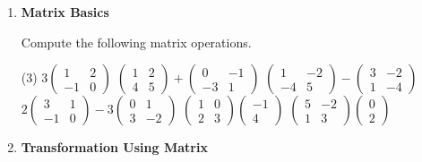 \begin{enumerate}
\item \textbf{Matrix Basics} 

Compute the following matrix operations.
\begin{tasks}[after-skip = 80pt, after-item-skip = 80pt](3)
\task $3 \begin{pmatrix} 1 & 2 \\ -1 & 0 \end{pmatrix}$
\task $\begin{pmatrix} 1 & 2 \\ 4 & 5 \end{pmatrix} + \begin{pmatrix} 0 & -1 \\ -3 & 1 \end{pmatrix}$
\task $\begin{pmatrix} 1 & -2 \\ -4 & 5 \end{pmatrix} - \begin{pmatrix} 3 & -2 \\ 1 & -4 \end{pmatrix}$
\task $2 \begin{pmatrix} 3 & 1 \\ -1 & 0 \end{pmatrix} - 3 \begin{pmatrix} 0 & 1 \\ 3 & -2 \end{pmatrix}$
\task $\begin{pmatrix} 1 & 0 \\ 2 & 3 \end{pmatrix} \begin{pmatrix} -1 \\ 4 \end{pmatrix}$
\task $\begin{pmatrix} 5 & -2 \\  1 & 3 \end{pmatrix} \begin{pmatrix} 0 \\ 2 \end{pmatrix}$
\end{tasks}


\item \textbf{Transformation Using Matrix} 


\end{enumerate}
